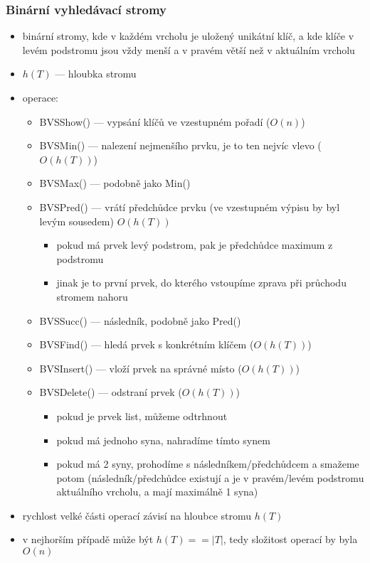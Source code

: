 \subsubsection*{Binární vyhledávací stromy}
\begin{itemize}
	\item binární stromy, kde v každém vrcholu je uložený unikátní klíč, a kde klíče v levém podstromu jsou vždy menší a v pravém větší než v aktuálním vrcholu
	\item $h(T)$ --- hloubka stromu
	\item operace:
	\begin{itemize}
		\item BVSShow() --- vypsání klíčů ve vzestupném pořadí ($O(n)$)
		\item BVSMin() --- nalezení nejmenšího prvku, je to ten nejvíc vlevo ($O(h(T))$)
		\item BVSMax() --- podobně jako Min()
		\item BVSPred() --- vrátí předchůdce prvku (ve vzestupném výpisu by byl levým sousedem) $O(h(T))$
		\begin{itemize}
			\item pokud má prvek levý podstrom, pak je předchůdce maximum z podstromu
			\item jinak je to první prvek, do kterého vstoupíme zprava při průchodu stromem nahoru
		\end{itemize}
		\item BVSSucc() --- následník, podobně jako Pred()
		\item BVSFind() --- hledá prvek s konkrétním klíčem ($O(h(T))$)
		\item BVSInsert() --- vloží prvek na správné místo ($O(h(T))$)
		\item BVSDelete() --- odstraní prvek ($O(h(T))$)
		\begin{itemize}
			\item pokud je prvek list, můžeme odtrhnout
			\item pokud má jednoho syna, nahradíme tímto synem
			\item pokud má 2 syny, prohodíme s následníkem/předchůdcem a smažeme potom (následník/před\-chůd\-ce existují a je v pravém/levém podstromu aktuálního vrcholu, a mají maximálně 1 syna)
		\end{itemize}
	\end{itemize}
	\item rychlost velké části operací závisí na hloubce stromu $h(T)$
	\item v nejhorším případě může být $h(T) == |T|$, tedy složitost operací by byla $O(n)$

\end{itemize}
